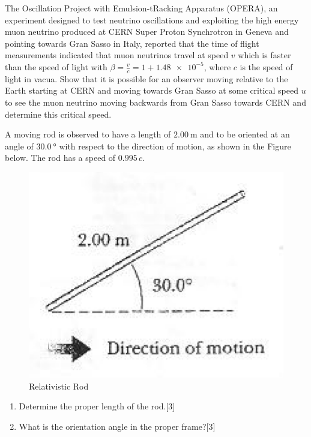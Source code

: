 \begin{problem}
    \begin{subproblem}
        The Oscillation Project with Emulsion-tRacking Apparatus (OPERA), an experiment designed to test neutrino oscillations and exploiting the high energy muon neutrino produced at CERN Super Proton Synchrotron in Geneva and pointing towards Gran Sasso in Italy, reported that the time of flight measurements indicated that muon neutrinos travel at speed $v$ which is faster than the speed of light with $\beta=\frac{v}{c}=1+\num{1.48e-5}$, where $c$ is the speed of light in vacua. Show that it is possible for an observer moving relative to the Earth starting at CERN and moving towards Gran Sasso at some critical speed $u$ to see the muon neutrino moving backwards from Gran Sasso towards CERN and determine this critical speed.
    \end{subproblem}
    \begin{subproblem}
        A moving rod is observed to have a length of $\qty{2.00}{\m}$ and to be oriented at an angle of $\qty{30.0}{\degree}$ with respect to the direction of motion, as shown in the Figure below. The rod has a speed of $0.995\,c$.
        \begin{figure}[h]
	        \centering
	        \includegraphics[width=0.7\linewidth]{spho_book_TYS_images/2011q10.png}
	          \caption{Relativistic Rod}
        \end{figure}
        \renewcommand{\theenumi}{(\alph{enumi})}
        \begin{enumerate}
            \item Determine the proper length of the rod.\hfill{[3]}
            \item What is the orientation angle in the proper frame?\hfill{[3]}
        \end{enumerate}
    \end{subproblem}
\end{problem}




